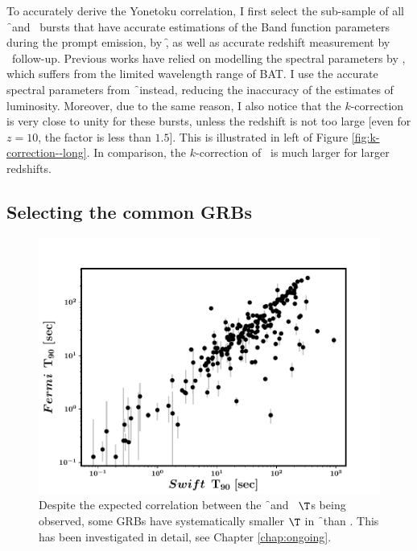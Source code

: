 To accurately derive the Yonetoku correlation, I first select the sub-sample of all \f\ and \s\ bursts that have accurate estimations of the Band function  parameters during the prompt emission, by \f, as well as accurate redshift measurement by \s\ follow-up. Previous works have relied on modelling the spectral parameters by \s, which suffers from the limited wavelength range of BAT. I use the accurate spectral parameters from \f\ instead, reducing the inaccuracy of the estimates of luminosity. Moreover, due to the same reason, I also notice that the $k$-correction is very close to unity for these bursts, unless the redshift is not too large [even for $z = 10$, the factor is less than $1.5$]. This is illustrated in left of Figure \ref{fig:k-correction--long}. In comparison, the $k$-correction of \s\ is much larger for larger redshifts.




\subsection{Selecting the common GRBs}
\label{sec:selecting_common_GRBs}

\begin{figure}
\begin{center}
\includegraphics[scale=0.5]{comparing_T90s_of_common_GRBS--all}
\caption[Comparison of $\T$s of \f\ and \s\, GRBs]{Despite the expected correlation between the \f\ and \s\ $\T$s being observed, some GRBs have systematically smaller $\T$ in \f\ than \s. This has been investigated in detail, see Chapter \ref{chap:ongoing}.}
\label{fig:T90_comparison}
\end{center}
\end{figure}

